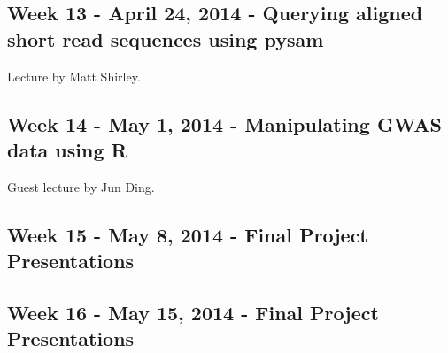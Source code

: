 \documentclass{article}
\begin{document}
\subsection*{Week 13 - April 24, 2014 - Querying aligned short read sequences using pysam}
Lecture by Matt Shirley.
\subsection*{Week 14 - May 1, 2014 - Manipulating GWAS data using R}
Guest lecture by Jun Ding.
\subsection*{Week 15 - May 8, 2014 - Final Project Presentations}
\subsection*{Week 16 - May 15, 2014 - Final Project Presentations}
\end{document}
